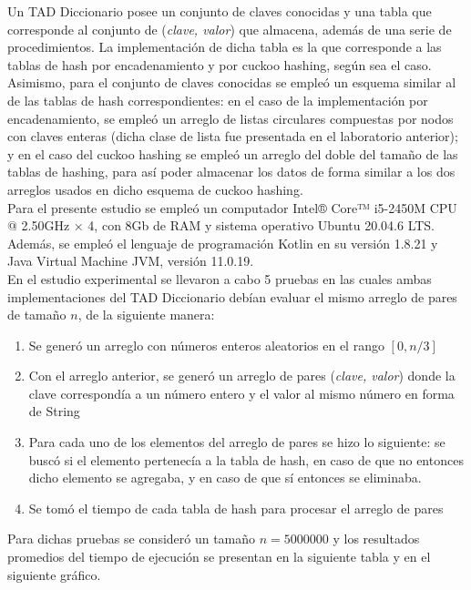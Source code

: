 \documentclass[titlepage]{article}
\begin{document}
	Un TAD Diccionario posee un conjunto de claves conocidas y una tabla que corresponde al conjunto de (\textit{clave, valor}) que almacena, adem\'as de una serie de procedimientos. La implementaci\'on de dicha tabla es la que corresponde a las tablas de hash por encadenamiento y por cuckoo hashing, seg\'un sea el caso.\\ 
	
	Asimismo, para el conjunto de claves conocidas se emple\'o un esquema similar al de las tablas de hash correspondientes: en el caso de la implementaci\'on por encadenamiento, se emple\'o un arreglo de listas circulares compuestas por nodos con claves enteras (dicha clase de lista fue presentada en el laboratorio anterior); y en el caso del cuckoo hashing se emple\'o un arreglo del doble del tamaño de las tablas de hashing, para as\'i poder almacenar los datos de forma similar a los dos arreglos usados en dicho esquema de cuckoo hashing.\\
	
	Para el presente estudio se emple\'o un computador Intel® Core™ i5-2450M CPU @ 2.50GHz × 4, con 8Gb de RAM y sistema operativo Ubuntu 20.04.6 LTS. Adem\'as, se emple\'o el lenguaje de programaci\'on Kotlin en su versi\'on 1.8.21 y Java Virtual Machine JVM, versi\'on 11.0.19.\\
	
	En el estudio experimental se llevaron a cabo 5 pruebas en las cuales ambas implementaciones del TAD Diccionario deb\'ian evaluar el mismo arreglo de pares de tamaño $n$, de la siguiente manera:
	\begin{enumerate}
		\item Se gener\'o un arreglo con n\'umeros enteros aleatorios en el rango $[0,n/3]$
		\item Con el arreglo anterior, se gener\'o un arreglo de pares (\textit{clave, valor}) donde la clave correspond\'ia a un n\'umero entero y el valor al mismo n\'umero en forma de String
		\item Para cada uno de los elementos del arreglo de pares se hizo lo siguiente: se busc\'o si el elemento pertenec\'ia a la tabla de hash, en caso de que no entonces dicho elemento se agregaba, y en caso de que s\'i entonces se eliminaba.
		\item Se tom\'o el tiempo de cada tabla de hash para procesar el arreglo de pares
	\end{enumerate}
	
	Para dichas pruebas se consider\'o un tamaño $n = 5000000$ y los resultados promedios del tiempo de ejecuci\'on se presentan en la siguiente tabla y en el siguiente gr\'afico.	
\end{document}
